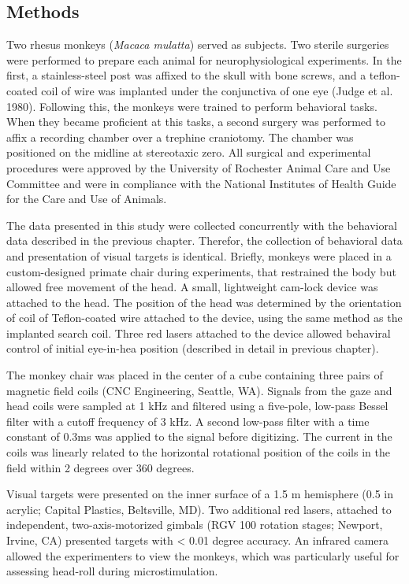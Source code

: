 \documentclass[]{article}
\begin{document}
\subsection{Methods}\label{methods}

Two rhesus monkeys (\emph{Macaca mulatta}) served as subjects. Two
sterile surgeries were performed to prepare each animal for
neurophysiological experiments. In the first, a stainless-steel post was
affixed to the skull with bone screws, and a teflon-coated coil of wire
was implanted under the conjunctiva of one eye (Judge et al. 1980).
Following this, the monkeys were trained to perform behavioral tasks.
When they became proficient at this tasks, a second surgery was
performed to affix a recording chamber over a trephine craniotomy. The
chamber was positioned on the midline at stereotaxic zero. All surgical
and experimental procedures were approved by the University of Rochester
Animal Care and Use Committee and were in compliance with the National
Institutes of Health Guide for the Care and Use of Animals.

The data presented in this study were collected concurrently with the
behavioral data described in the previous chapter. Therefor, the
collection of behavioral data and presentation of visual targets is
identical. Briefly, monkeys were placed in a custom-designed primate
chair during experiments, that restrained the body but allowed free
movement of the head. A small, lightweight cam-lock device was attached
to the head. The position of the head was determined by the orientation
of coil of Teflon-coated wire attached to the device, using the same
method as the implanted search coil. Three red lasers attached to the
device allowed behaviral control of initial eye-in-hea position
(described in detail in previous chapter).

The monkey chair was placed in the center of a cube containing three
pairs of magnetic field coils (CNC Engineering, Seattle, WA). Signals
from the gaze and head coils were sampled at 1 kHz and filtered using a
five-pole, low-pass Bessel filter with a cutoff frequency of 3 kHz. A
second low-pass filter with a time constant of 0.3ms was applied to the
signal before digitizing. The current in the coils was linearly related
to the horizontal rotational position of the coils in the field within 2
degrees over 360 degrees.

Visual targets were presented on the inner surface of a 1.5 m hemisphere
(0.5 in acrylic; Capital Plastics, Beltsville, MD). Two additional red
lasers, attached to independent, two-axis-motorized gimbals (RGV 100
rotation stages; Newport, Irvine, CA) presented targets with \textless{}
0.01 degree accuracy. An infrared camera allowed the experimenters to
view the monkeys, which was particularly useful for assessing head-roll
during microstimulation.
\end{document}
